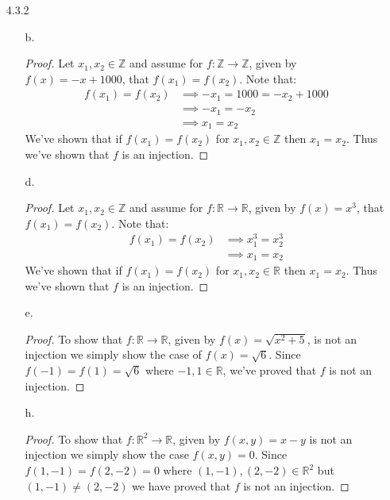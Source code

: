 \documentclass[11pt]{amsart}
\theoremstyle{definition}
\begin{document}
\begin{itemize}
\begin{itemize}
\item[h.] \begin{proof}
		Let $f:\mathbb{R}^2\to\mathbb{R}$, given by $f(x,y)=x-y$, is a surjection. Let $x\in\mathbb{R}$ and $y=0\in\mathbb{R}$ so $(x,y)=(x,0)$. Then $f(x,y)=x-0=x\in\mathbb{R}$. Thus we've proved that $f$ is a surjection.
	\end{proof}

\end{itemize}

\item[4.3.2]
\begin{itemize}
	\item[b.] \begin{proof}
		Let $x_1,x_2\in\mathbb{Z}$ and assume for $f:\mathbb{Z}\to\mathbb{Z}$, given by $f(x)=-x+1000$, that $f(x_1)=f(x_2)$. Note that:
		\begin{align*}
			f(x_1)=f(x_2)
			&\implies -x_1=1000=-x_2+1000\\
			&\implies -x_1=-x_2\\
			&\implies x_1=x_2
		\end{align*}
		We've shown that if $f(x_1)=f(x_2)$ for $x_1,x_2\in\mathbb{Z}$ then $x_1=x_2$. Thus we've shown that $f$ is an injection.
	\end{proof}

	\item[d.] \begin{proof}
		Let $x_1,x_2\in\mathbb{Z}$ and assume for $f:\mathbb{R}\to\mathbb{R}$, given by $f(x)=x^3$, that $f(x_1)=f(x_2)$. Note that:
		\begin{align*}
			f(x_1)=f(x_2)
			&\implies x_1^3=x_2^3\\
			&\implies x_1=x_2
		\end{align*}
		We've shown that if $f(x_1)=f(x_2)$ for $x_1,x_2\in\mathbb{R}$ then $x_1=x_2$. Thus we've shown that $f$ is an injection.
	\end{proof}

	\item[e.] \begin{proof}
		To show that $f:\mathbb{R}\to\mathbb{R}$, given by $f(x)=\sqrt{x^2+5}$, is not an injection we simply show the case of $f(x)=\sqrt{6}$. Since $f(-1)=f(1)=\sqrt{6}$ where $-1,1\in\mathbb{R}$, we've proved that $f$ is not an injection.	
	\end{proof}

	\item[h.] \begin{proof}
		To show that $f:\mathbb{R}^2\to\mathbb{R}$, given by $f(x,y)=x-y$ is not an injection we simply show the case $f(x,y)=0$. Since $f(1,-1)=f(2,-2)=0$ where $(1,-1),(2,-2)\in\mathbb{R}^2$ but $(1,-1)\ne(2,-2)$ we have proved that $f$ is not an injection.
	\end{proof}


\end{itemize}
\end{itemize}
\end{document}
